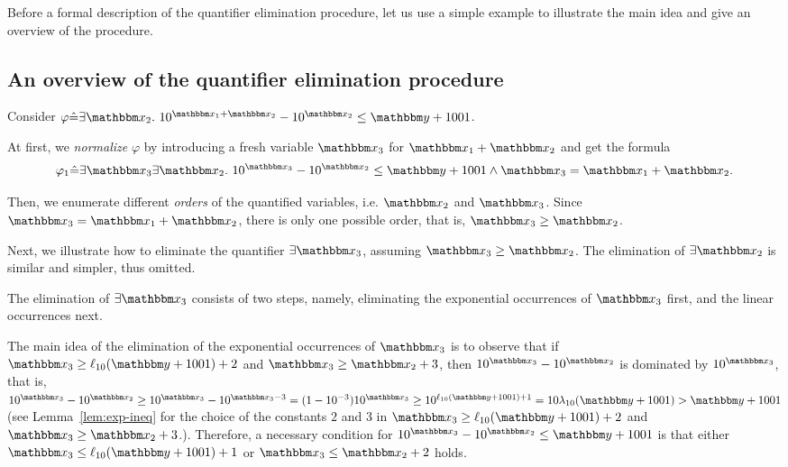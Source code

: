 Before a formal description of the quantifier elimination procedure, let us use a simple example to illustrate the main idea and give an overview of the procedure.

\vspace{-4mm}

\subsection{An overview of the quantifier elimination procedure}
Consider $\varphi \Def \exists \ivarx_2.\ 10^{\ivarx_1 + \ivarx_2} - 10^{\ivarx_2} \le \ivary + 1001$. 

At first, we \emph{normalize} $\varphi$ by introducing a fresh variable $\ivarx_3$ for $\ivarx_1 + \ivarx_2$ and get the formula 
$$\varphi_1 \Def \exists \ivarx_3 \exists \ivarx_2.\ 10^{\ivarx_3} - 10^{\ivarx_2} \le \ivary + 1001 \wedge \ivarx_3 = \ivarx_1 + \ivarx_2.$$

Then, we enumerate different \emph{orders} of the quantified variables, i.e. $\ivarx_2$ and $\ivarx_3$. Since $\ivarx_3 = \ivarx_1 + \ivarx_2$, there is only one possible order, that is, $\ivarx_3 \ge \ivarx_2$.

Next, we illustrate how to eliminate the quantifier $\exists \ivarx_3$, assuming $\ivarx_3 \ge \ivarx_2$. The elimination of $\exists \ivarx_2$ is similar and simpler, thus omitted.

The elimination of $\exists \ivarx_3$ consists of two steps, namely, eliminating the exponential occurrences of $\ivarx_3$ first, and the linear occurrences next.

The main idea of the elimination of the exponential occurrences of $\ivarx_3$ is to observe that if $\ivarx_3 \ge \ell_{10}(\ivary+1001)+2$ and $\ivarx_3 \ge \ivarx_2 + 3$, then $10^{\ivarx_3} - 10^{\ivarx_2}$ is dominated by $10^{\ivarx_3}$, that is, $10^{\ivarx_3} - 10^{\ivarx_2} \ge 10^{\ivarx_3} - 10^{\ivarx_3 - 3} = (1-10^{-3}) 10^{\ivarx_3} \ge 10^{\ell_{10}(\ivary+1001)+1} = 10\lambda_{10}(\ivary+1001) > \ivary+1001$ (see Lemma~\ref{lem:exp-ineq} for the choice of the constants $2$ and $3$ in $\ivarx_3 \ge \ell_{10}(\ivary+1001)+2$ and $\ivarx_3 \ge \ivarx_2 + 3$.). 
Therefore, a necessary condition for $10^{\ivarx_3} - 10^{\ivarx_2} \le \ivary + 1001$ is that either $\ivarx_3 \le \ell_{10}(\ivary+1001)+1$ or $\ivarx_3 \le \ivarx_2 + 2$ holds.  


